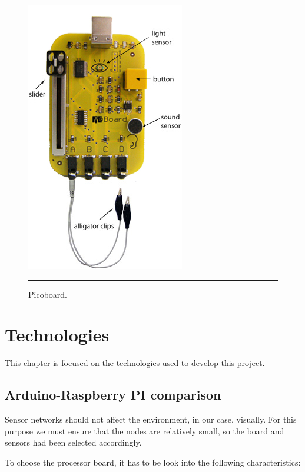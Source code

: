 \documentclass[12pt, a4paper,twoside]{tesi_upf}
\begin{document}
      \begin{figure}[htbp]
          \centering
              \includegraphics[scale=0.5]{./Figures/picoboard.jpg}
              \\
              \rule{16em}{0.5pt}
          \caption[Picoboard]{Picoboard.}
          \label{fig:picoboard}
       \end{figure}

\chapter{Technologies}
\label{Chapter3}
  
  This chapter is focused on the technologies used to develop this project.
  
  \section{Arduino-Raspberry PI comparison}
  
  	Sensor networks should not affect the environment, in our case, visually. For this purpose we must ensure that the nodes are relatively small, so the board and sensors had been selected accordingly.
    
    To choose the processor board, it has to be look into the following characteristics:
    
\end{document}
